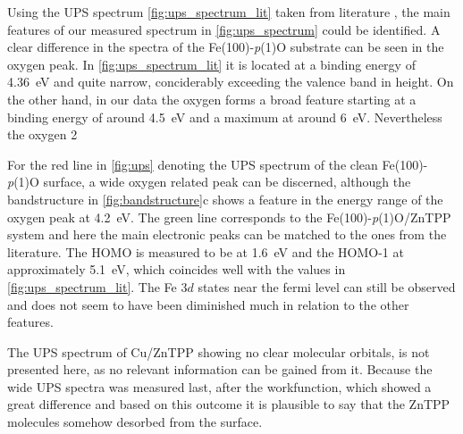 \FloatBarrier
Using the UPS spectrum \autoref{fig:ups_spectrum_lit} taken from literature \cite*{tesi}, the main features of our measured spectrum in \autoref{fig:ups_spectrum} could be identified.
A clear difference in the spectra of the Fe(100)-\textit{p}(1)O substrate can be seen in the oxygen peak. In \autoref{fig:ups_spectrum_lit} it is located at a binding energy of \qty{4.36}{eV} and quite narrow, conciderably exceeding the valence band in height. 
On the other hand, in our data the oxygen forms a broad feature starting at a binding energy of around \qty{4.5}{eV} and a maximum at around \qty{6}{eV}.
Nevertheless the oxygen 2\text 


For the red line in \autoref{fig:ups} denoting the UPS spectrum of the clean Fe(100)-\textit{p}(1)O surface, a wide oxygen related peak can be discerned, although the bandstructure in \autoref{fig:bandstructure}c shows a feature in the energy range of the oxygen peak at \qty{4.2}{eV}.
The green line corresponds to the Fe(100)-\textit{p}(1)O/ZnTPP system and here the main electronic peaks can be matched to the ones from the literature.
The HOMO is measured to be at \qty{1.6}{eV} and the HOMO-1 at approximately \qty{5.1}{eV}, which coincides well with the values in \autoref{fig:ups_spectrum_lit}.
The Fe $3d$ states near the fermi level can still be observed and does not seem to have been diminished much in relation to the other features.

The UPS spectrum of Cu/ZnTPP showing no clear molecular orbitals, is not presented here, as no relevant information can be gained from it.
Because the wide UPS spectra was measured last, after the workfunction, which showed a great difference and based on this outcome it is plausible to say that the ZnTPP molecules somehow desorbed from the surface.

